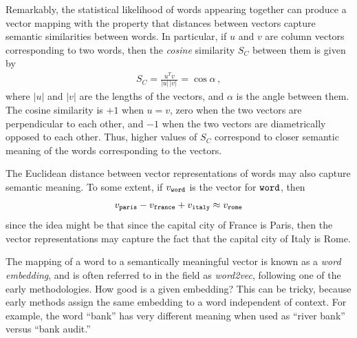 Remarkably, the statistical likelihood of words appearing together can produce a vector mapping with the property that distances between vectors capture semantic similarities between words.  In particular, if $u$ and $v$ are column vectors corresponding to two words, then the {\em cosine} similarity $S_{C}$ between them is given by
\begin{eqnarray}
  S_{C} = \frac{u^T v}{ |u|\, |v|\,} = \cos\alpha
  \,,
\end{eqnarray}
where $|u|$ and $|v|$ are the lengths of the vectors, and $\alpha$ is the angle between them.  The cosine similarity is $+1$ when $u=v$, zero when the two vectors are perpendicular to each other, and $-1$ when the two vectors are diametrically opposed to each other.  Thus, higher values of $S_C$ correspond to closer semantic meaning of the words corresponding to the vectors.

The Euclidean distance between vector representations of words may also capture semantic meaning.  To some extent, if $v_{\tt word}$ is the vector for ${\tt word}$, then
\begin{eqnarray}
  v_{\tt paris} - v_{\tt france} + v_{\tt italy} \approx v_{\tt rome}
\end{eqnarray}
since the idea might be that since the capital city of France is Paris, then the vector representations may capture the fact that the capital city of Italy is Rome.

The mapping of a word to a semantically meaningful vector is known as a {\em word embedding}, and is often referred to in the field as {\em word2vec}, following one of the early methodologies.  How good is a given embedding?  This can be tricky, because early methods assign the same embedding to a word independent of context.  For example, the word ``bank'' has very different meaning when used as ``river bank'' versus ``bank audit.''

